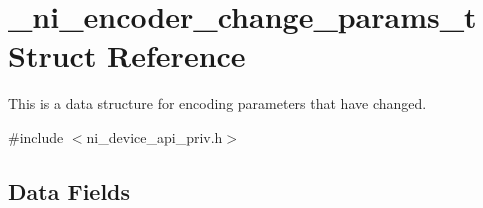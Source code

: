 \hypertarget{struct__ni__encoder__change__params__t}{}\section{\+\_\+ni\+\_\+encoder\+\_\+change\+\_\+params\+\_\+t Struct Reference}
\label{struct__ni__encoder__change__params__t}


This is a data structure for encoding parameters that have changed.  




{\ttfamily \#include $<$ni\+\_\+device\+\_\+api\+\_\+priv.\+h$>$}

\subsection*{Data Fields}
